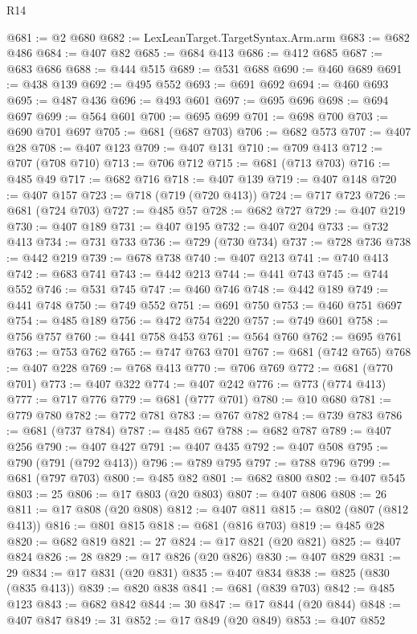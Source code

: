 \begin{lexlean}{R14}
\begin{coremodule}
@681 := @2 @680
@682 := LexLeanTarget.TargetSyntax.Arm.arm
@683 := @682 @486
@684 := @407 @82
@685 := @684 @413
@686 := @412 @685
@687 := @683 @686
@688 := @444 @515
@689 := @531 @688
@690 := @460 @689
@691 := @438 @139
@692 := @495 @552
@693 := @691 @692
@694 := @460 @693
@695 := @487 @436
@696 := @493 @601
@697 := @695 @696
@698 := @694 @697
@699 := @564 @601
@700 := @695 @699
@701 := @698 @700
@703 := @690 @701 @697
@705 := @681 (@687 @703)
@706 := @682 @573
@707 := @407 @28
@708 := @407 @123
@709 := @407 @131
@710 := @709 @413
@712 := @707 (@708 @710)
@713 := @706 @712
@715 := @681 (@713 @703)
@716 := @485 @49
@717 := @682 @716
@718 := @407 @139
@719 := @407 @148
@720 := @407 @157
@723 := @718 (@719 (@720 @413))
@724 := @717 @723
@726 := @681 (@724 @703)
@727 := @485 @57
@728 := @682 @727
@729 := @407 @219
@730 := @407 @189
@731 := @407 @195
@732 := @407 @204
@733 := @732 @413
@734 := @731 @733
@736 := @729 (@730 @734)
@737 := @728 @736
@738 := @442 @219
@739 := @678 @738
@740 := @407 @213
@741 := @740 @413
@742 := @683 @741
@743 := @442 @213
@744 := @441 @743
@745 := @744 @552
@746 := @531 @745
@747 := @460 @746
@748 := @442 @189
@749 := @441 @748
@750 := @749 @552
@751 := @691 @750
@753 := @460 @751 @697
@754 := @485 @189
@756 := @472 @754 @220
@757 := @749 @601
@758 := @756 @757
@760 := @441 @758 @453
@761 := @564 @760
@762 := @695 @761
@763 := @753 @762
@765 := @747 @763 @701
@767 := @681 (@742 @765)
@768 := @407 @228
@769 := @768 @413
@770 := @706 @769
@772 := @681 (@770 @701)
@773 := @407 @322
@774 := @407 @242
@776 := @773 (@774 @413)
@777 := @717 @776
@779 := @681 (@777 @701)
@780 := @10 @680
@781 := @779 @780
@782 := @772 @781
@783 := @767 @782
@784 := @739 @783
@786 := @681 (@737 @784)
@787 := @485 @67
@788 := @682 @787
@789 := @407 @256
@790 := @407 @427
@791 := @407 @435
@792 := @407 @508
@795 := @790 (@791 (@792 @413))
@796 := @789 @795
@797 := @788 @796
@799 := @681 (@797 @703)
@800 := @485 @82
@801 := @682 @800
@802 := @407 @545
@803 := 25
@806 := @17 @803 (@20 @803)
@807 := @407 @806
@808 := 26
@811 := @17 @808 (@20 @808)
@812 := @407 @811
@815 := @802 (@807 (@812 @413))
@816 := @801 @815
@818 := @681 (@816 @703)
@819 := @485 @28
@820 := @682 @819
@821 := 27
@824 := @17 @821 (@20 @821)
@825 := @407 @824
@826 := 28
@829 := @17 @826 (@20 @826)
@830 := @407 @829
@831 := 29
@834 := @17 @831 (@20 @831)
@835 := @407 @834
@838 := @825 (@830 (@835 @413))
@839 := @820 @838
@841 := @681 (@839 @703)
@842 := @485 @123
@843 := @682 @842
@844 := 30
@847 := @17 @844 (@20 @844)
@848 := @407 @847
@849 := 31
@852 := @17 @849 (@20 @849)
@853 := @407 @852

\end{coremodule}
\end{lexlean}
